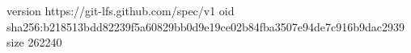 version https://git-lfs.github.com/spec/v1
oid sha256:b218513bdd82239f5a60829bb0d9e19ce02b84fba3507e94de7c916b9dac2939
size 262240

